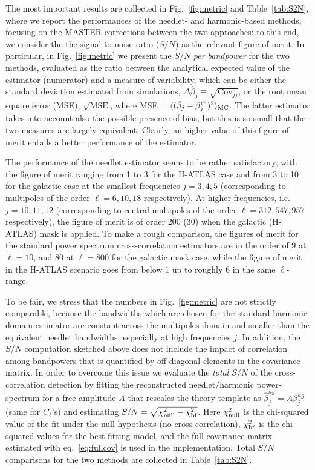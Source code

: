 \documentclass[a4paper,11pt]{article}
\begin{document}
The most important results are collected in Fig.~\ref{fig:metric} and Table~\ref{tab:S2N}, where we report the performances of the needlet- and harmonic-based methods, focusing on the MASTER corrections between the two approaches: to this end, we consider the the signal-to-noise ratio ($S/N$) as the relevant figure of merit. In particular, in Fig.~\ref{fig:metric} we present the $S/N$ \textit{per bandpower} for the two methods, evaluated as the ratio between the analytical expected value of the estimator (numerator) and a measure of variability, which can be either the standard deviation estimated from simulations, $\Delta\hat{\beta}_j \equiv \sqrt{\text{Cov}_{jj}}$, or the root mean square error (MSE), $\sqrt{\text{MSE}}$, where MSE $= \langle (\hat{\beta}_j - \beta_j^{\rm th})^2 \rangle_{\rm MC}$. The latter estimator takes into account also the possible presence of bias, but this is so small that the two measures are largely equivalent. Clearly, an higher value of this figure of merit entails a better performance of the estimator.

The performance of the needlet estimator seems to be rather satisfactory, with the figure of merit ranging from 1 to 3 for the H-ATLAS case and from 3 to 10 for the galactic case at the smallest frequencies $j=3,4,5$ (corresponding to multipoles of the order $\ell = 6, 10, 18$ respectively). At higher  frequencies, i.e. $j=10,11,12$ (corresponding to central multipoles of the order $\ell = 312,547,957$ respectively), the figure of merit is of order 200 (30) when the galactic (H-ATLAS) mask is applied. To make a rough comparison, the figures of merit for the standard power spectrum cross-correlation estimators are in the order of 9 at $\ell = 10$, and 80 at $\ell = 800$ for the galactic mask case, while the 
figure of merit in the H-ATLAS scenario goes from below 1 up to roughly 6 in the same $\ell$-range. 

To be fair, we stress that the numbers in Fig.~\ref{fig:metric} are not strictly comparable, because the bandwidths which are chosen for the standard harmonic domain estimator are constant across the multipoles domain and smaller than the equivalent needlet bandwidths, especially at high frequencies $j$. In addition, the $S/N$ computation sketched above does not include the impact of correlation among bandpowers that is quantified by off-diagonal elements in the covariance matrix. In order to overcome this issue we evaluate the \textit{total} $S/N$ of the cross-correlation detection by fitting the reconstructed needlet/harmonic power-spectrum for a free amplitude $A$ that rescales the theory template as $\hat{\beta}_j^{\kappa g} = A \beta_j^{\kappa g}$ (same for $C_{\ell}$'s) and estimating $S/N = \sqrt{\chi^2_{\rm null} - \chi^2_{\rm bf}}$. Here $\chi^2_{\rm null}$ is the chi-squared value of the fit under the null hypothesis (no cross-correlation), $\chi^2_{\rm bf}$ is the chi-squared values for the best-fitting model, and the full covariance matrix estimated with eq.~\ref{eq:fullcov} is used in the implementation. Total $S/N$ comparisons for the two methods are collected in Table~\ref{tab:S2N}.
\end{document}
